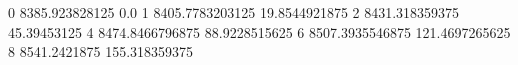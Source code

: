0 8385.923828125 0.0
1 8405.7783203125 19.8544921875
2 8431.318359375 45.39453125
4 8474.8466796875 88.9228515625
6 8507.3935546875 121.4697265625
8 8541.2421875 155.318359375
